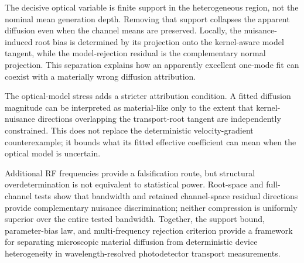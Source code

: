 \documentclass[aps,pra,twocolumn,superscriptaddress,nofootinbib]{revtex4-2}
\begin{document}
The decisive optical variable is finite support in the heterogeneous region, not the nominal mean generation depth. Removing that support collapses the apparent diffusion even when the channel means are preserved. Locally, the nuisance-induced root bias is determined by its projection onto the kernel-aware model tangent, while the model-rejection residual is the complementary normal projection. This separation explains how an apparently excellent one-mode fit can coexist with a materially wrong diffusion attribution.

The optical-model stress adds a stricter attribution condition. A fitted diffusion magnitude can be interpreted as material-like only to the extent that kernel-nuisance directions overlapping the transport-root tangent are independently constrained. This does not replace the deterministic velocity-gradient counterexample; it bounds what its fitted effective coefficient can mean when the optical model is uncertain.


Additional RF frequencies provide a falsification route, but structural overdetermination is not equivalent to statistical power. Root-space and full-channel tests show that bandwidth and retained channel-space residual directions provide complementary nuisance discrimination; neither compression is uniformly superior over the entire tested bandwidth. Together, the support bound, parameter-bias law, and multi-frequency rejection criterion provide a framework for separating microscopic material diffusion from deterministic device heterogeneity in wavelength-resolved photodetector transport measurements.



\end{document}
